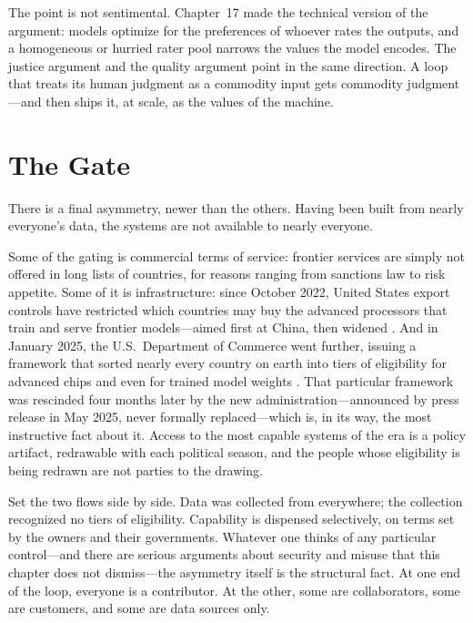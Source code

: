 The point is not sentimental. Chapter~17 made the technical version of the argument: \rlhf models optimize for the preferences of whoever rates the outputs, and a homogeneous or hurried rater pool narrows the values the model encodes. The justice argument and the quality argument point in the same direction. A loop that treats its human judgment as a commodity input gets commodity judgment---and then ships it, at scale, as the values of the machine.

\section{The Gate}
\label{sec:ch18-gate}

There is a final asymmetry, newer than the others. Having been built from nearly everyone's data, the systems are not available to nearly everyone.

Some of the gating is commercial terms of service: frontier \ai services are simply not offered in long lists of countries, for reasons ranging from sanctions law to risk appetite. Some of it is infrastructure: since October 2022, United States export controls have restricted which countries may buy the advanced processors that train and serve frontier models---aimed first at China, then widened \autocite{bis2022controls}. And in January 2025, the U.S.\ Department of Commerce went further, issuing a framework that sorted nearly every country on earth into tiers of eligibility for advanced chips and even for trained model weights \autocite{bis2025diffusion}. That particular framework was rescinded four months later by the new administration---announced by press release in May 2025, never formally replaced---which is, in its way, the most instructive fact about it. Access to the most capable systems of the era is a policy artifact, redrawable with each political season, and the people whose eligibility is being redrawn are not parties to the drawing.

Set the two flows side by side. Data was collected from everywhere; the collection recognized no tiers of eligibility. Capability is dispensed selectively, on terms set by the owners and their governments. Whatever one thinks of any particular control---and there are serious arguments about security and misuse that this chapter does not dismiss---the asymmetry itself is the structural fact. At one end of the loop, everyone is a contributor. At the other, some are collaborators, some are customers, and some are data sources only.


